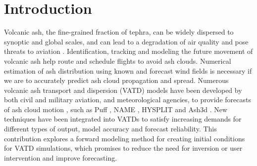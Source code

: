 \documentclass[utf8]{frontiersSCNS} %
\begin{document}
\section{Introduction}
Volcanic ash, the fine-grained fraction of tephra, can be widely dispersed to synoptic and global scales, and can lead to a degradation of air quality and pose threats to aviation \citep{tupper2007facing}. Identification, tracking and modeling the future movement of volcanic ash help route and schedule flights to avoid ash clouds. Numerical estimation of ash distribution using known and forecast wind fields is necessary if we are to accurately predict ash cloud propagation and spread. Numerous volcanic ash transport and dispersion (VATD) models have been developed by both civil and military aviation, and meteorological agencies, to provide forecasts of ash cloud motion \citep{witham2007comparison}, such as Puff \citep{tanaka1991development,searcy1998puff}, NAME \citep{jones2007uk}, HYSPLIT \citep{stein2015noaa, rolph2017real} and Ash3d \citep{schwaiger2012ash3d}. New techniques have been integrated into VATDs to satisfy increasing demands for different types of output, model accuracy and forecast reliability. This contribution explores a forward modeling method for creating initial conditions for VATD simulations, which promises to reduce the need for inversion or user intervention and improve forecasting.
\end{document}

